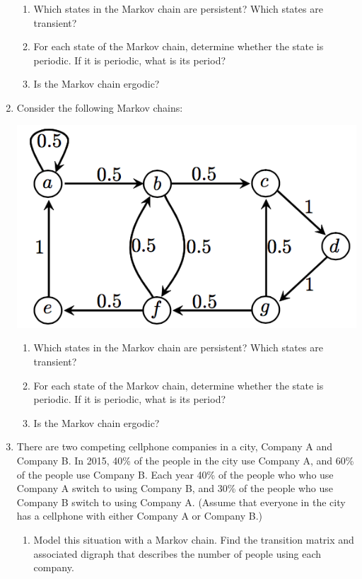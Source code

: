 \documentclass{article}
\begin{document}
\begin{enumerate}
	\begin{enumerate}
		\item Which states in the Markov chain are persistent? Which states are transient?

		\item For each state of the Markov chain, determine whether the state is periodic. If it is periodic, what is its period?

		\item Is the Markov chain ergodic?
	\end{enumerate}

	\item Consider the following Markov chains:
	\begin{center}
	\includegraphics[width=.5\textwidth]{pic5.png}
	\end{center}	


	\begin{enumerate}
		\item Which states in the Markov chain are persistent? Which states are transient?

		\item For each state of the Markov chain, determine whether the state is periodic. If it is periodic, what is its period?

		\item Is the Markov chain ergodic?
	\end{enumerate}

	\item There are two competing cellphone companies in a city, Company A and Company B. In 2015, 40\% of the people in the city use Company A, and 60\% of the people use Company B. Each year 40\% of the people who who use Company A switch to using Company B, and 30\% of the people who use Company B switch to using Company A. (Assume that everyone in the city has a cellphone with either Company A or Company B.)

	\begin{enumerate}
		\item Model this situation with a Markov chain. Find the transition matrix and associated digraph that describes the number of people using each company.


\end{enumerate}
\end{enumerate}
\end{document}
